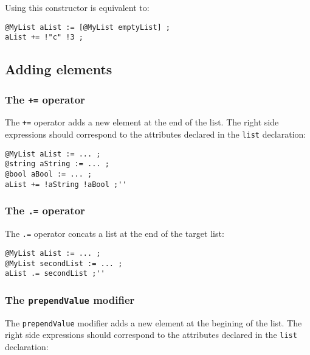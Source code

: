 Using this constructor is equivalent to:

\begin{lstlisting}[language=galgas]
@MyList aList := [@MyList emptyList] ;
aList += !"c" !3 ;
\end{lstlisting}

\subsection{Adding elements}

\subsubsection{The \lstinline[language=galgas]!+=! operator}

The  \lstinline[language=galgas]!+=! operator adds a new element at the end of the list. The right side expressions should correspond to the attributes declared in the \lstinline[language=galgas]!list! declaration:\\

\begin{lstlisting}[language=galgas]
@MyList aList := ... ;
@string aString := ... ;
@bool aBool := ... ;
aList += !aString !aBool ;''
\end{lstlisting}


\subsubsection{The \lstinline[language=galgas]!.=! operator}

The \lstinline[language=galgas]!.=! operator concats a list at the end of the target list:

\begin{lstlisting}[language=galgas]
@MyList aList := ... ;
@MyList secondList := ... ;
aList .= secondList ;''
\end{lstlisting}



\subsubsection{The \lstinline[language=galgas]!prependValue! modifier}

The \lstinline[language=galgas]!prependValue! modifier adds a new element at the begining of the list. The right side expressions should correspond to the attributes declared in the  \lstinline[language=galgas]!list! declaration:

